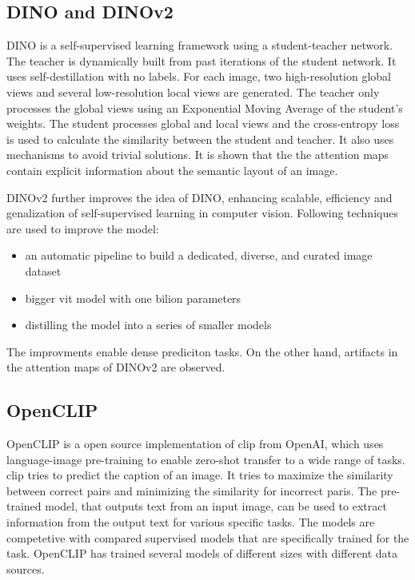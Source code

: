 \documentclass[conference]{IEEEtran}
\begin{document}
  \subsection{\mbox{DINO} and \mbox{DINOv2}}
  \label{sec:dino-dinov2}

  \mbox{DINO} is a self-supervised learning framework using a student-teacher network. The teacher is dynamically built from past iterations of the student network. It uses self-destillation with no labels. For each image, two high-resolution global views and several low-resolution local views are generated. The teacher only processes the global views using an Exponential Moving Average of the student's weights. The student processes global and local views and the cross-entropy loss is used to calculate the similarity between the student and teacher. It also uses mechanisms to avoid trivial solutions. \cite{dino} It is shown that the the attention maps contain explicit information about the semantic layout of an image. \cite{registers}

  \mbox{DINOv2} further improves the idea of \mbox{DINO}, enhancing scalable, efficiency and genalization of self-supervised learning in computer vision. Following techniques are used to improve the model:
  \begin{itemize}
    \item  an automatic pipeline to build a dedicated, diverse, and curated image dataset
    \item  bigger \ac{vit} model with one bilion parameters
    \item distilling the model into a series of smaller models \cite{dinov2}
  \end{itemize}
  The improvments enable dense prediciton tasks. On the other hand, artifacts in the attention maps of \mbox{DINOv2} are observed. \cite{registers}

  \subsection{OpenCLIP}
  \label{sec:openclip}

  \mbox{OpenCLIP} is a open source implementation of \ac{clip} \cite{clip} from OpenAI, which uses language-image pre-training to enable zero-shot transfer to a wide range of tasks. \ac{clip} tries to predict the caption of an image. It tries to maximize the similarity between correct pairs and minimizing the similarity for incorrect paris. The pre-trained model, that outputs text from an input image, can be used to extract information from the output text for various specific tasks. The models are competetive with compared supervised models that are specifically trained for the task. \cite{clip}
  \mbox{OpenCLIP} has trained several models of different sizes with different data sources. \cite{open-clip} 
\end{document}

